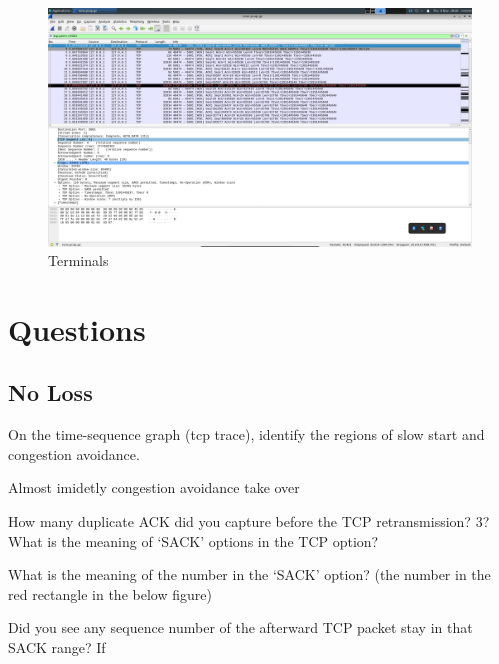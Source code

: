 \documentclass{article}
\begin{document}
\begin{figure}[htp]
    \centering
    \includegraphics[width=.9\textwidth]{screenshot}%
    \caption{Terminals}
\end{figure}

\clearpage
\section*{Questions}
\subsection*{No Loss}
\noindent
On the time-sequence graph (tcp trace), identify the regions of slow start and
congestion avoidance.

Almost imidetly congestion avoidance take over

\noindent
How many duplicate ACK did you capture before the TCP retransmission?
3?
\noindent
What is the meaning of `SACK' options in the TCP option?

\noindent
What is the meaning of the number in the `SACK' option? (the number in the red
rectangle in the below figure)

\noindent
Did you see any sequence number of the afterward TCP packet stay in that SACK range? If
\end{document}
